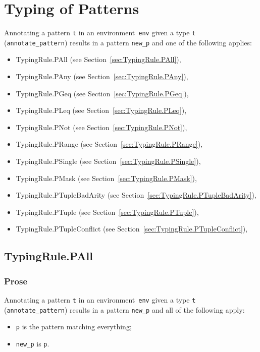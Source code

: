 \documentclass{book}
\begin{document}
\chapter{Typing of Patterns}
Annotating a pattern \texttt{t} in an environment~\texttt{env} given a type \texttt{t} (\texttt{annotate\_pattern}) results in a pattern \texttt{new\_p} and one of the following applies:
\begin{itemize}
\item TypingRule.PAll (see Section~\ref{sec:TypingRule.PAll}),
\item TypingRule.PAny (see Section~\ref{sec:TypingRule.PAny}),
\item TypingRule.PGeq (see Section~\ref{sec:TypingRule.PGeq}),
\item TypingRule.PLeq (see Section~\ref{sec:TypingRule.PLeq}),
\item TypingRule.PNot (see Section~\ref{sec:TypingRule.PNot}),
\item TypingRule.PRange (see Section~\ref{sec:TypingRule.PRange}),
\item TypingRule.PSingle (see Section~\ref{sec:TypingRule.PSingle}),
\item TypingRule.PMask (see Section~\ref{sec:TypingRule.PMask}),
\item TypingRule.PTupleBadArity (see Section~\ref{sec:TypingRule.PTupleBadArity}),
\item TypingRule.PTuple (see Section~\ref{sec:TypingRule.PTuple}),
\item TypingRule.PTupleConflict (see Section~\ref{sec:TypingRule.PTupleConflict}),
\end{itemize}

\section{TypingRule.PAll \label{sec:TypingRule.PAll}}

  \subsection{Prose}
   Annotating a pattern \texttt{t} in an environment~\texttt{env} given a type \texttt{t} (\texttt{annotate\_pattern}) results in a pattern \texttt{new\_p} and all of the following apply:
   \begin{itemize}
   \item \texttt{p} is the pattern matching everything;
   \item \texttt{new\_p} is \texttt{p}.
   \end{itemize}
\end{document}
